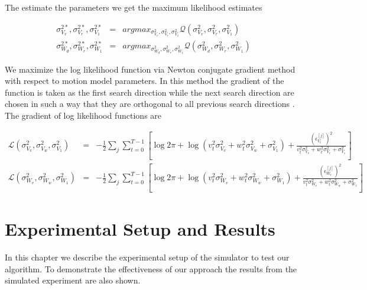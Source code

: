 \documentclass[12pt]{dalcsthesis}
\begin{document}
The estimate the parameters we get the maximum likelihood estimates 

\begin{eqnarray}
\sigma_{V_{v}}^{2*},\sigma_{V_{r}}^{2*},\sigma_{V_{1}}^{2*} & = & argmax_{\sigma_{V_{v}}^{2},\sigma_{V_{r}}^{2},\sigma_{V_{1}}^{2}}\mathcal{Q}(\sigma_{V_{v}}^{2},\sigma_{V_{r}}^{2},\sigma_{V_{1}}^{2})\\
\sigma_{W_{d}}^{2*},\sigma_{W_{r}}^{2*},\sigma_{W_{1}}^{2*} & = & argmax_{\sigma_{W_{d}}^{2},\sigma_{W_{r}}^{2},\sigma_{W_{1}}^{2}}\mathcal{Q}(\sigma_{W_{d}}^{2},\sigma_{W_{r}}^{2},\sigma_{W_{1}}^{2})
\end{eqnarray}

We maximize the log likelihood function via Newton conjugate gradient method with respect to motion model parameters. In this method the gradient of the function is taken as the first search direction while the next search direction are chosen in such a way that they are orthogonal to all previous search directions \cite{shewchuk1994introduction}. The gradient of log likelihood functions are 

\begin{eqnarray}
\mathcal{{L}}(\sigma_{V_{v}}^{2},\sigma_{V_{w}}^{2},\sigma_{V_{1}}^{2})&=&-\frac{1}{2}\sum_{j}\sum_{t=0}^{T-1}[\log2\pi+\log(v_{t}^{2}\sigma_{V_{v}}^{2}+w_{t}^{2}\sigma_{V_{w}}^{2}+\sigma_{V_{1}}^{2})+\frac{(\epsilon_{V_{t}}^{[j]})^{2}}{v_{t}^{2}\sigma_{V_{v}}^{2}+w_{t}^{2}\sigma_{V_{r}}^{2}+\sigma_{V_{1}}^{2}}]\\
\mathcal{{L}}(\sigma_{W_{v}}^{2},\sigma_{W_{w}}^{2},\sigma_{W_{1}}^{2})&=&-\frac{1}{2}\sum_{j}\sum_{t=0}^{T-1}[\log2\pi+\log(v_{t}^{2}\sigma_{W_{v}}^{2}+w_{t}^{2}\sigma_{W_{w}}^{2}+\sigma_{W_{1}}^{2})+\frac{(\epsilon_{W_{t}}^{[j]})^{2}}{v_{t}^{2}\sigma_{W_{v}}^{2}+w_{t}^{2}\sigma_{W_{w}}^{2}+\sigma_{W_{1}}^{2}}]
\end{eqnarray}


\chapter{Experimental Setup and Results}
\label{ch-: results adapting motion model}
In this chapter we describe the experimental setup of the simulator to test our algorithm. To demonstrate the effectiveness of our approach the results from the simulated experiment are also shown.
\end{document}
